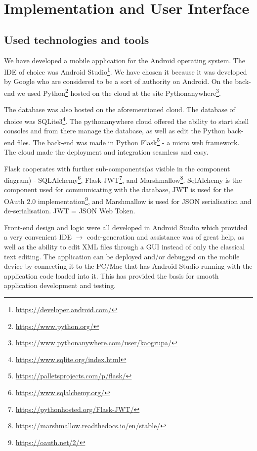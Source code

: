 \chapter{Implementation and User Interface}
		
		\section{Used technologies and tools}
		
		We have developed a mobile application for the Android operating system. The IDE of choice was Android Studio\footnote{\url{https://developer.android.com/}}. We have chosen it because it was developed by Google who are considered to be a sort of authority on Android. On the back-end we used Python\footnote{\url{https://www.python.org/}} hosted on the cloud at the site Pythonanywhere\footnote{\url{https://www.pythonanywhere.com/user/kaogrupa/}}.
		
		The database was also hosted on the aforementioned cloud. The database of choice was SQLite3\footnote{\url{https://www.sqlite.org/index.html}}. The pythonanywhere cloud offered the ability to start shell consoles and from there manage the database, as well as edit the Python back-end files. The back-end was made in Python Flask\footnote{\url{https://palletsprojects.com/p/flask/}} - a micro web framework. The cloud made the deployment and integration seamless and easy.
		
		Flask cooperates with further sub-components(as visible in the component diagram) - SQLAlchemy\footnote{\url{https://www.sqlalchemy.org/}}, Flask-JWT\footnote{\url{https://pythonhosted.org/Flask-JWT/}}, and Marshmallow\footnote{\url{https://marshmallow.readthedocs.io/en/stable/}}. SqlAlchemy is the component used for communicating with the database, JWT is used for the OAuth 2.0 implementation\footnote{\url{https://oauth.net/2/}}, and Marshmallow is used for JSON serialisation and de-serialisation. JWT = JSON Web Token.
		
		Front-end design and logic were all developed in Android Studio which provided a very convenient IDE $\rightarrow$ code-generation and assistance was of great help, as well as the ability to edit XML files through a GUI instead of only the classical text editing. The application can be deployed and/or debugged on the mobile device by connecting it to the PC/Mac that has Android Studio running with the application code loaded into it. This has provided the basis for smooth application development and testing.
		

